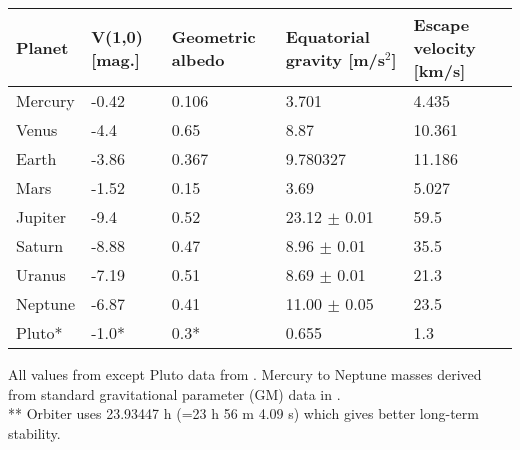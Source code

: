 \documentclass[Orbiter User Manual.tex]{subfiles}
\begin{document}
	\begin{longtable}{ |p{}|p{}|p{}|p{}|p{}| }
	\hline\rule{0pt}{2ex}
	\textbf{Planet} & \textbf{V(1,0) [mag.]} & \textbf{Geometric albedo} & \textbf{Equatorial gravity [m/s$^{2}$]} & \textbf{Escape velocity [km/s]}\\
	\hline\rule{0pt}{2ex}
	Mercury & -0.42 & 0.106 & 3.701 & 4.435\\
	\hline\rule{0pt}{2ex}
	Venus & -4.4 & 0.65 & 8.87 & 10.361\\
	\hline\rule{0pt}{2ex}
	Earth & -3.86 & 0.367 & 9.780327 & 11.186\\
	\hline\rule{0pt}{2ex}
	Mars & -1.52 & 0.15 & 3.69 & 5.027\\
	\hline\rule{0pt}{2ex}
	Jupiter & -9.4 & 0.52 & 23.12 $\pm$ 0.01 & 59.5\\
	\hline\rule{0pt}{2ex}
	Saturn & -8.88 & 0.47 & 8.96 $\pm$ 0.01 & 35.5\\
	\hline\rule{0pt}{2ex}
	Uranus & -7.19 & 0.51 & 8.69 $\pm$ 0.01 & 21.3\\
	\hline\rule{0pt}{2ex}
	Neptune & -6.87 & 0.41 & 11.00 $\pm$ 0.05 & 23.5\\ 
	\hline\rule{0pt}{2ex}
	Pluto* & -1.0* & 0.3* & 0.655 & 1.3\\
	\hline
	\end{longtable}

\noindent
All values from \cite{yoder1995} except Pluto data from \cite{seidelmann1992p706}. Mercury to Neptune masses derived from standard gravitational parameter (GM) data in \cite{yoder1995}.\\
** Orbiter uses 23.93447 h (=23 h 56 m 4.09 s) which gives better long-term stability.
\end{document}
